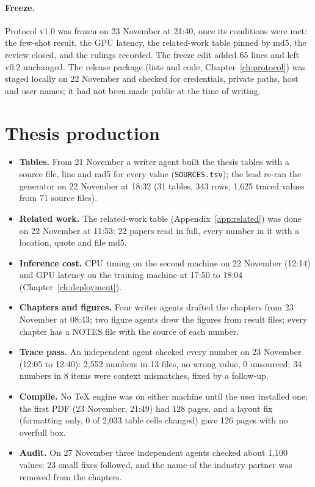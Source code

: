 \paragraph{Freeze.} Protocol v1.0 was frozen on 23 November at 21:40, once its conditions were met: the few-shot result, the GPU
latency, the related-work table pinned by md5, the review closed, and the rulings recorded. The freeze edit added 65 lines and left
v0.2 unchanged. The release package (lists and code, Chapter~\ref{ch:protocol}) was staged locally on 22 November and checked for
credentials, private paths, host and user names; it had not been made public at the time of writing.

\section{Thesis production}\label{sec:build-thesis}

\begin{itemize}
  \item \textbf{Tables.} From 21 November a writer agent built the thesis tables with a source file, line and md5 for every value
    (\texttt{SOURCES.tsv}); the lead re-ran the generator on 22 November at 18:32 (31 tables, 343 rows, 1,625 traced values from 71
    source files).
  \item \textbf{Related work.} The related-work table (Appendix~\ref{app:related}) was done on 22 November at 11:53: 22 papers read in
    full, every number in it with a location, quote and file md5.
  \item \textbf{Inference cost.} CPU timing on the second machine on 22 November (12:14) and GPU latency on the training machine at
    17:50 to 18:04 (Chapter~\ref{ch:deployment}).
  \item \textbf{Chapters and figures.} Four writer agents drafted the chapters from 23 November at 08:43; two figure agents drew the
    figures from result files; every chapter has a NOTES file with the source of each number.
  \item \textbf{Trace pass.} An independent agent checked every number on 23 November (12:05 to 12:40): 2,552 numbers in 13 files, no
    wrong value, 0 unsourced; 34 numbers in 8 items were context mismatches, fixed by a follow-up.
  \item \textbf{Compile.} No TeX engine was on either machine until the user installed one; the first PDF (23 November, 21:49) had
    128 pages, and a layout fix (formatting only, 0 of 2,033 table cells changed) gave 126 pages with no overfull box.
  \item \textbf{Audit.} On 27 November three independent agents checked about 1,100 values; 23 small fixes followed, and the name of
    the industry partner was removed from the chapters.
\end{itemize}

